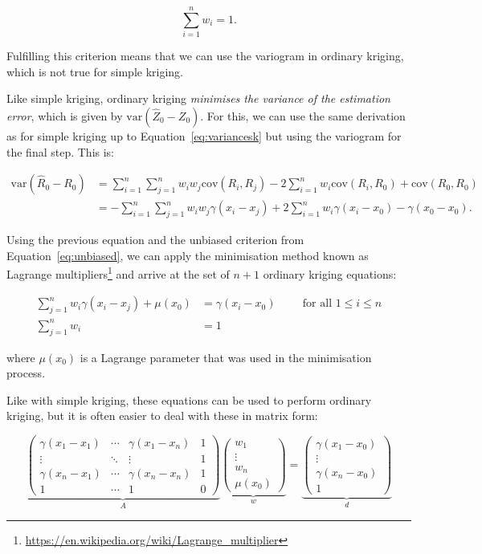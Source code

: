 \begin{equation}
\sum_{i=1}^n w_i = 1.
\end{equation}

Fulfilling this criterion means that we can use the variogram in ordinary kriging, which is not true for simple kriging.

Like simple kriging, ordinary kriging \emph{minimises the variance of the estimation error}, which is given by \(\mathrm{var}\left(\hat{Z}_0 - Z_0\right)\).
For this, we can use the same derivation as for simple kriging up to Equation~\ref{eq:variancesk} but using the variogram for the final step.
This is:

\begin{align}
\mathrm{var}\left(\hat{R}_0 - R_0\right) &= \sum_{i=1}^n \sum_{j=1}^n w_i w_j \mathrm{cov}(R_i, R_j) - 2\sum_{i=1}^n w_i \mathrm{cov}(R_i,R_0) + \mathrm{cov}(R_0, R_0) \nonumber \\
&= -\sum_{i=1}^n \sum_{j=1}^n w_i w_j \gamma(x_i-x_j) + 2\sum_{i=1}^n w_i \gamma(x_i-x_0) - \gamma(x_0-x_0).
\end{align}

Using the previous equation and the unbiased criterion from Equation~\ref{eq:unbiased}, we can apply the minimisation method known as Lagrange multipliers\footnote{\url{https://en.wikipedia.org/wiki/Lagrange_multiplier}} and arrive at the set of \(n+1\) ordinary kriging equations:

\begin{align}
\sum_{j=1}^n w_i \gamma(x_i-x_j) + \mu(x_0) &= \gamma(x_i - x_0) \hspace{1cm} \text{for all } 1 \leq i \leq n \nonumber \\
\sum_{j=1}^n w_i &= 1 
\end{align}

where \(\mu(x_0)\) is a Lagrange parameter that was used in the minimisation process.

Like with simple kriging, these equations can be used to perform ordinary kriging, but it is often easier to deal with these in matrix form:

\begin{equation}
%
\underbrace{\left( \begin{array}{cccc}
\gamma(x_1-x_1) & \cdots & \gamma(x_1-x_n) & 1 \\
\vdots & \ddots & \vdots & 1 \\
\gamma(x_n-x_1) & \cdots & \gamma(x_n-x_n) & 1 \\
1 & \cdots & 1 & 0 \end{array} \right)}_{A}
%
\underbrace{\left(\begin{array}{c}
w_1 \\
\vdots \\
w_n \\
\mu(x_0) \end{array} \right)}_{w} = 
%
\underbrace{\left(\begin{array}{c}
\gamma(x_1-x_0) \\
\vdots \\
\gamma(x_n-x_0) \\
1 \end{array} \right)}_{d}
\end{equation}

